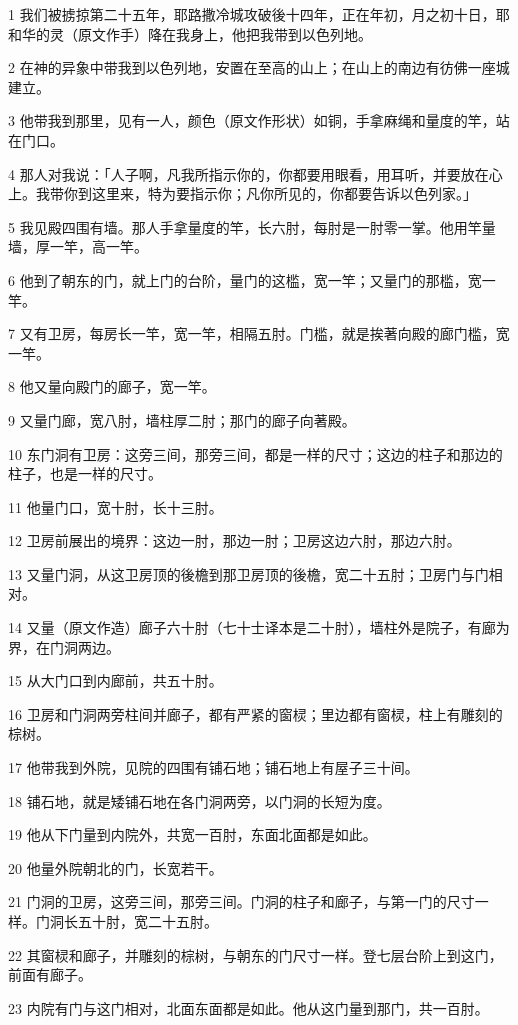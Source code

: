 \par 1 我们被掳掠第二十五年，耶路撒冷城攻破後十四年，正在年初，月之初十日，耶和华的灵（原文作手）降在我身上，他把我带到以色列地。
\par 2 在神的异象中带我到以色列地，安置在至高的山上；在山上的南边有彷佛一座城建立。
\par 3 他带我到那里，见有一人，颜色（原文作形状）如铜，手拿麻绳和量度的竿，站在门口。
\par 4 那人对我说：「人子啊，凡我所指示你的，你都要用眼看，用耳听，并要放在心上。我带你到这里来，特为要指示你；凡你所见的，你都要告诉以色列家。」
\par 5 我见殿四围有墙。那人手拿量度的竿，长六肘，每肘是一肘零一掌。他用竿量墙，厚一竿，高一竿。
\par 6 他到了朝东的门，就上门的台阶，量门的这槛，宽一竿；又量门的那槛，宽一竿。
\par 7 又有卫房，每房长一竿，宽一竿，相隔五肘。门槛，就是挨著向殿的廊门槛，宽一竿。
\par 8 他又量向殿门的廊子，宽一竿。
\par 9 又量门廊，宽八肘，墙柱厚二肘；那门的廊子向著殿。
\par 10 东门洞有卫房：这旁三间，那旁三间，都是一样的尺寸；这边的柱子和那边的柱子，也是一样的尺寸。
\par 11 他量门口，宽十肘，长十三肘。
\par 12 卫房前展出的境界：这边一肘，那边一肘；卫房这边六肘，那边六肘。
\par 13 又量门洞，从这卫房顶的後檐到那卫房顶的後檐，宽二十五肘；卫房门与门相对。
\par 14 又量（原文作造）廊子六十肘（七十士译本是二十肘），墙柱外是院子，有廊为界，在门洞两边。
\par 15 从大门口到内廊前，共五十肘。
\par 16 卫房和门洞两旁柱间并廊子，都有严紧的窗棂；里边都有窗棂，柱上有雕刻的棕树。
\par 17 他带我到外院，见院的四围有铺石地；铺石地上有屋子三十间。
\par 18 铺石地，就是矮铺石地在各门洞两旁，以门洞的长短为度。
\par 19 他从下门量到内院外，共宽一百肘，东面北面都是如此。
\par 20 他量外院朝北的门，长宽若干。
\par 21 门洞的卫房，这旁三间，那旁三间。门洞的柱子和廊子，与第一门的尺寸一样。门洞长五十肘，宽二十五肘。
\par 22 其窗棂和廊子，并雕刻的棕树，与朝东的门尺寸一样。登七层台阶上到这门，前面有廊子。
\par 23 内院有门与这门相对，北面东面都是如此。他从这门量到那门，共一百肘。
